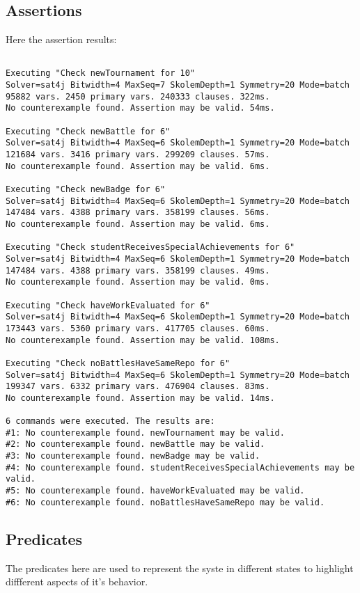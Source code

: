 \subsection{Assertions}
Here the assertion results:
\begin{lstlisting}[basicstyle=\footnotesize]

Executing "Check newTournament for 10"
Solver=sat4j Bitwidth=4 MaxSeq=7 SkolemDepth=1 Symmetry=20 Mode=batch
95882 vars. 2450 primary vars. 240333 clauses. 322ms.
No counterexample found. Assertion may be valid. 54ms.

Executing "Check newBattle for 6"
Solver=sat4j Bitwidth=4 MaxSeq=6 SkolemDepth=1 Symmetry=20 Mode=batch
121684 vars. 3416 primary vars. 299209 clauses. 57ms.
No counterexample found. Assertion may be valid. 6ms.

Executing "Check newBadge for 6"
Solver=sat4j Bitwidth=4 MaxSeq=6 SkolemDepth=1 Symmetry=20 Mode=batch
147484 vars. 4388 primary vars. 358199 clauses. 56ms.
No counterexample found. Assertion may be valid. 6ms.

Executing "Check studentReceivesSpecialAchievements for 6"
Solver=sat4j Bitwidth=4 MaxSeq=6 SkolemDepth=1 Symmetry=20 Mode=batch
147484 vars. 4388 primary vars. 358199 clauses. 49ms.
No counterexample found. Assertion may be valid. 0ms.

Executing "Check haveWorkEvaluated for 6"
Solver=sat4j Bitwidth=4 MaxSeq=6 SkolemDepth=1 Symmetry=20 Mode=batch
173443 vars. 5360 primary vars. 417705 clauses. 60ms.
No counterexample found. Assertion may be valid. 108ms.

Executing "Check noBattlesHaveSameRepo for 6"
Solver=sat4j Bitwidth=4 MaxSeq=6 SkolemDepth=1 Symmetry=20 Mode=batch
199347 vars. 6332 primary vars. 476904 clauses. 83ms.
No counterexample found. Assertion may be valid. 14ms.

6 commands were executed. The results are:
#1: No counterexample found. newTournament may be valid.
#2: No counterexample found. newBattle may be valid.
#3: No counterexample found. newBadge may be valid.
#4: No counterexample found. studentReceivesSpecialAchievements may be valid.
#5: No counterexample found. haveWorkEvaluated may be valid.
#6: No counterexample found. noBattlesHaveSameRepo may be valid.
\end{lstlisting}
\clearpage
\subsection{Predicates}
The predicates here are used to represent the syste in different states to highlight diffferent aspects of it's behavior.
